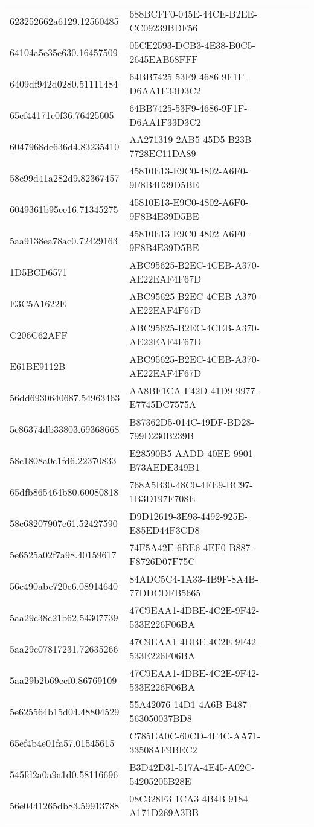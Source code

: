 \begin{tabular}{ll}
623252662a6129.12560485 & 688BCFF0-045E-44CE-B2EE-CC09239BDF56 \\
64104a5e35e630.16457509 & 05CE2593-DCB3-4E38-B0C5-2645EAB68FFF \\
6409df942d0280.51111484 & 64BB7425-53F9-4686-9F1F-D6AA1F33D3C2 \\
65cf44171c0f36.76425605 & 64BB7425-53F9-4686-9F1F-D6AA1F33D3C2 \\
6047968de636d4.83235410 & AA271319-2AB5-45D5-B23B-7728EC11DA89 \\
58c99d41a282d9.82367457 & 45810E13-E9C0-4802-A6F0-9F8B4E39D5BE \\
6049361b95ee16.71345275 & 45810E13-E9C0-4802-A6F0-9F8B4E39D5BE \\
5aa9138ea78ac0.72429163 & 45810E13-E9C0-4802-A6F0-9F8B4E39D5BE \\
1D5BCD6571 & ABC95625-B2EC-4CEB-A370-AE22EAF4F67D \\
E3C5A1622E & ABC95625-B2EC-4CEB-A370-AE22EAF4F67D \\
C206C62AFF & ABC95625-B2EC-4CEB-A370-AE22EAF4F67D \\
E61BE9112B & ABC95625-B2EC-4CEB-A370-AE22EAF4F67D \\
56dd6930640687.54963463 & AA8BF1CA-F42D-41D9-9977-E7745DC7575A \\
5c86374db33803.69368668 & B87362D5-014C-49DF-BD28-799D230B239B \\
58c1808a0c1fd6.22370833 & E28590B5-AADD-40EE-9901-B73AEDE349B1 \\
65dfb865464b80.60080818 & 768A5B30-48C0-4FE9-BC97-1B3D197F708E \\
58c68207907e61.52427590 & D9D12619-3E93-4492-925E-E85ED44F3CD8 \\
5e6525a02f7a98.40159617 & 74F5A42E-6BE6-4EF0-B887-F8726D07F75C \\
56c490abc720c6.08914640 & 84ADC5C4-1A33-4B9F-8A4B-77DDCDFB5665 \\
5aa29c38c21b62.54307739 & 47C9EAA1-4DBE-4C2E-9F42-533E226F06BA \\
5aa29c07817231.72635266 & 47C9EAA1-4DBE-4C2E-9F42-533E226F06BA \\
5aa29b2b69ccf0.86769109 & 47C9EAA1-4DBE-4C2E-9F42-533E226F06BA \\
5e625564b15d04.48804529 & 55A42076-14D1-4A6B-B487-563050037BD8 \\
65ef4b4e01fa57.01545615 & C785EA0C-60CD-4F4C-AA71-33508AF9BEC2 \\
545fd2a0a9a1d0.58116696 & B3D42D31-517A-4E45-A02C-54205205B28E \\
56e0441265db83.59913788 & 08C328F3-1CA3-4B4B-9184-A171D269A3BB \\

\end{tabular}
